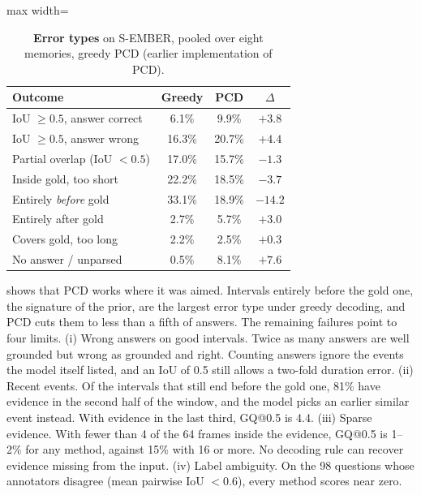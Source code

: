 \begin{table}[t]
  \centering
  \small
  \setlength{\tabcolsep}{3pt}
  \caption{\textbf{Error types} on S-EMBER, pooled over eight memories, greedy \vs PCD
  (earlier implementation of PCD).}
  \label{tab:errors}
  \begin{adjustbox}{max width=\linewidth}\begin{tabular}{@{}lccc@{}}
    \toprule
    Outcome & Greedy & PCD & $\Delta$ \\
    \midrule
    IoU $\geq 0.5$, answer correct      & \phantom{0}6.1\% & \phantom{0}9.9\% & $+3.8$ \\
    IoU $\geq 0.5$, answer wrong        & 16.3\% & 20.7\% & $+4.4$ \\
    Partial overlap (IoU $<0.5$)        & 17.0\% & 15.7\% & $-1.3$ \\
    Inside gold, too short              & 22.2\% & 18.5\% & $-3.7$ \\
    Entirely \emph{before} gold         & 33.1\% & 18.9\% & $-14.2$ \\
    Entirely after gold                 & \phantom{0}2.7\% & \phantom{0}5.7\% & $+3.0$ \\
    Covers gold, too long               & \phantom{0}2.2\% & \phantom{0}2.5\% & $+0.3$ \\
    No answer / unparsed           & \phantom{0}0.5\% & \phantom{0}8.1\% & $+7.6$ \\
    \bottomrule
  \end{tabular}\end{adjustbox}
\end{table}

 shows that PCD works where it was aimed. Intervals entirely before the gold one, the signature of
the prior, are the largest error type under greedy decoding, and PCD cuts them to less than a fifth of answers. The
remaining failures point to four limits.
(i) Wrong answers on good intervals. Twice as many answers are well grounded but wrong as grounded and right.
Counting answers ignore the events the model itself listed, and an IoU of 0.5 still allows a two-fold duration error.
(ii) Recent events. Of the intervals that still end before the gold one, 81\% have evidence in the second half of the
window, and the model picks an earlier similar event instead. With evidence in the last third, GQ@0.5 is 4.4.
(iii) Sparse evidence. With fewer than 4 of the 64 frames inside the evidence, GQ@0.5 is 1--2\% for any method,
against 15\% with 16 or more. No decoding rule can recover evidence missing from the input.
(iv) Label ambiguity. On the 98 questions whose annotators disagree (mean pairwise IoU $<0.6$), every method
scores near zero.
